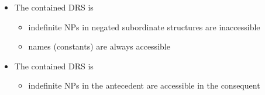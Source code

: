 \documentclass[headrule,footrule]{foils}
\begin{document}
\begin{exe}
   \ex 
  \begin{xlist}
    \ex {}
  \end{xlist}
  \ex 
  \end{exe}
  \begin{itemize}
  \item The contained DRS is 
    \begin{itemize}
    \item indefinite NPs in negated subordinate structures are inaccessible
    \item names (constants) are always accessible
    \end{itemize}
  \end{itemize}


\begin{exe}
   \ex 
  \begin{xlist}
    \ex {}
  \end{xlist}
  \ex 
  \end{exe}
  \begin{itemize}
  \item The contained DRS is 
    \begin{itemize}
    \item indefinite NPs in the antecedent are accessible in the consequent
    \end{itemize}
  \end{itemize}
\end{document}
